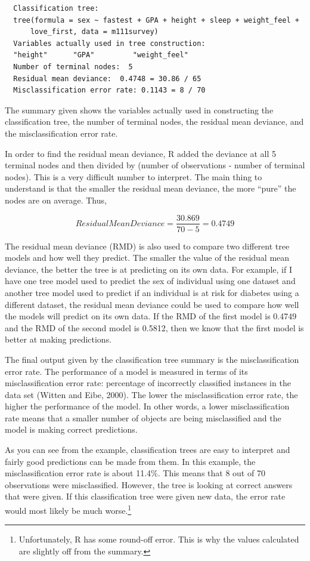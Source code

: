 \documentclass[12pt,twoside]{reedthesis}
\begin{document}
  \begin{verbatim}
  Classification tree:
  tree(formula = sex ~ fastest + GPA + height + sleep + weight_feel + 
      love_first, data = m111survey)
  Variables actually used in tree construction:
  "height"      "GPA"         "weight_feel"
  Number of terminal nodes:  5 
  Residual mean deviance:  0.4748 = 30.86 / 65 
  Misclassification error rate: 0.1143 = 8 / 70
  \end{verbatim}
  
  The summary given shows the variables actually used in constructing the
  classification tree, the number of terminal nodes, the residual mean
  deviance, and the misclassification error rate.
  
  In order to find the residual mean deviance, R added the deviance at all
  5 terminal nodes and then divided by (number of observations - number of
  terminal nodes). This is a very difficult number to interpret. The main
  thing to understand is that the smaller the residual mean deviance, the
  more ``pure'' the nodes are on average. Thus,
  
  \[ Residual Mean Deviance = \frac{30.869}{70-5} = 0.4749\]
  
  The residual mean deviance (RMD) is also used to compare two different
  tree models and how well they predict. The smaller the value of the
  residual mean deviance, the better the tree is at predicting on its own
  data. For example, if I have one tree model used to predict the sex of
  individual using one dataset and another tree model used to predict if
  an individual is at risk for diabetes using a different dataset, the
  residual mean deviance could be used to compare how well the models will
  predict on its own data. If the RMD of the first model is 0.4749 and the
  RMD of the second model is 0.5812, then we know that the first model is
  better at making predictions.
  
  The final output given by the classification tree summary is the
  misclassification error rate. The performance of a model is measured in
  terms of its misclassification error rate: percentage of incorrectly
  classified instances in the data set (Witten and Eibe, 2000). The lower
  the misclassification error rate, the higher the performance of the
  model. In other words, a lower misclassification rate means that a
  smaller number of objects are being misclassified and the model is
  making correct predictions.
  
  As you can see from the example, classification trees are easy to
  interpret and fairly good predictions can be made from them. In this
  example, the misclassification error rate is about 11.4\%. This means
  that 8 out of 70 observations were misclassified. However, the tree is
  looking at correct answers that were given. If this classification tree
  were given new data, the error rate would most likely be much
  worse.\footnote{Unfortunately, R has some round-off error. This is why
    the values calculated are slightly off from the summary.}
  
\end{document}
